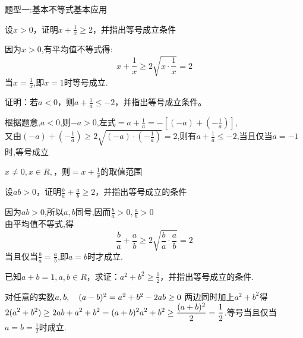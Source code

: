 \documentclass[11pt,a4paper]{ctexbook}
\begin{document}
\begin{tcolorbox} 
\centering
题型一:基本不等式基本应用
\end{tcolorbox}
\par
\begin{problem}
    设$x>0$，证明$\displaystyle x+\frac{1}{x} \ge 2$，并指出等号成立条件
    \begin{jiexi}
        因为$x>0$,有平均值不等式得:
        $$x+\frac{1}{x} \ge 2\sqrt{x\cdot\frac{1}{x}} = 2$$
        当$x=\frac{1}{x}$,即$x=1$时等号成立.
    \end{jiexi}
\end{problem}

\par
\begin{problem}
    证明：若$ a<0$，则$\displaystyle a+\frac{1}{a} \le -2$，并指出等号成立条件。
    \begin{jiexi}
       根据题意,$a<0$,则$-a>0$,左式$\displaystyle =a+\frac{1}{a}=-[(-a)+(-\frac{1}{a})]$,\\
       又由$\displaystyle (-a)+(-\frac{1}{a})\ge 2\sqrt{(-a)\cdot(-\frac{1}{a})} = 2$,则有$a+\frac{1}{a}\le -2$,当且仅当$a=-1$时,等号成立
    \end{jiexi}
\end{problem}

\par
\begin{problem}
    $x \ne 0,x\in R,$，则$\displaystyle =x+\frac{1}{x}$的取值范围\tiankong{$(-\infty,-2]\cup[2,+\infty)$}
\end{problem}

\par
\begin{problem}
    设$ab>0$，证明$\displaystyle \frac{b}{a}+\frac{a}{b}\ge 2$，并指出等号成立的条件
    \begin{jiexi}
        因为$ab>0$,所以$a,b$同号,因而$\displaystyle \frac{b}{a}>0,\frac{a}{b}>0$
        \\ 由平均值不等式,得
            $$
            \frac{b}{a}+\frac{a}{b}\ge 2\sqrt{\frac{b}{a}\cdot\frac{a}{b}}=2
            $$
            当且仅当$\displaystyle \frac{b}{a}=\frac{a}{b}$,即$a=b$时才成立.
     \end{jiexi}
\end{problem}

\par
\begin{problem}
    已知$a+b=1,a,b \in R$，求证：$\displaystyle a^2+b^2\ge \frac{1}{2}$，并指出等号成立的条件.
    \begin{jiexi}
        对任意的实数$a,b, \quad (a-b)^2 = a^2+b^2-2ab \ge 0\\$
        两边同时加上$a^2+b^2$得$\displaystyle 2(a^2+b^2)\ge 2ab +a^2+b^2=(a+b)^2\\
        a^2+b^2\ge \frac{(a+b)^2}{2} = \frac{1}{2}$.等号当且仅当$\displaystyle a=b=\frac{1}{2}$时成立.
    \end{jiexi}
\end{problem}
\end{document}
